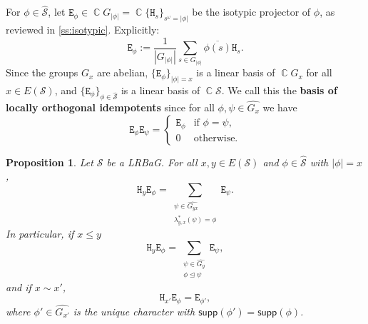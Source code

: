 \documentclass[11pt, oneside, reqno]{amsart}
\newtheorem{prop}[theorem]{Proposition}
\theoremstyle{definition}
\numberwithin{equation}{section}
\DeclareMathOperator{\C}{\mathbb{C}}
\newcommand{\defn}[1]{{\color{RoyalBlue}\bf#1}}
\def \SS{{\mathcal{S}}}
\def \kk{\C}
\def \ol{\overline}
\def \wh{\widehat}
\DeclareMathOperator{\chleq}{\unlhd}
\def \supp{\mathsf{supp}}
\newcommand{\B}[1]{\mathtt{#1}} 			%
\newcommand{\abs}[1]{|{#1}|} 				%
\begin{document}
For $\phi \in \wh{\SS}$, let $\B{E}_\phi \in \kk G_{\abs{\phi}} = \kk \{ \B{H}_s \}_{s^\omega = \abs{\phi}}$ be the isotypic projector of $\phi$, as reviewed in \cref{ss:isotypic}.
Explicitly:
\begin{equation}
    \B{E}_\phi := \dfrac{1}{|G_{\abs{\phi}}|} \sum_{s \in G_{\abs{\phi}}} \ol{\phi(s)} \B{H}_s.
\end{equation}
Since the groups $G_x$ are abelian, $\{ \B{E}_\phi \}_{\abs{\phi} = x}$ is a linear basis of $\kk G_x$ for all $x \in E(\SS)$, and $\{ \B{E}_\phi \}_{\phi \in \wh{\SS}}$ is a linear basis of $\kk \SS$.
We call this the \defn{basis of locally orthogonal idempotents} since for all $\phi,\psi \in \wh{G_x}$ we have
\begin{equation}
    \B{E}_\phi \B{E}_\psi =
    \begin{cases}
        \B{E}_\phi 	& 	\text{if } \phi = \psi,\\
        0			&	\text{otherwise.}
    \end{cases}
\end{equation}

\begin{prop}\label{prop:multiplyEandH}
    Let $\SS$ be a LRBaG. For all $x,y \in E(\SS)$ and $\phi \in \wh{\SS}$ with $\abs{\phi} = x$,
    \[
        \B{H}_y \B{E}_\phi = \sum_{\substack{\psi \in \wh{G_{yx}}\\ \lambda_{y,x}^*(\psi) = \phi}} \B{E}_\psi.
    \]
    In particular, if $x \leq y$ 
    \begin{equation} \label{eq:EandHmultiplication}
        \B{H}_y \B{E}_\phi =
        \sum_{\substack{\psi \in \wh{G_y} \\ \phi \chleq \psi}} \B{E}_\psi,
    \end{equation}
    and if $x \sim x'$,
    \begin{equation} \label{eq:EandHmultiplication2}
        \B{H}_{x'} \B{E}_\phi = \B{E}_{\phi'},
    \end{equation}
    where $\phi' \in \wh{G_{x'}}$ is the unique character with $\supp(\phi') = \supp(\phi)$.
\end{prop}
\end{document}
